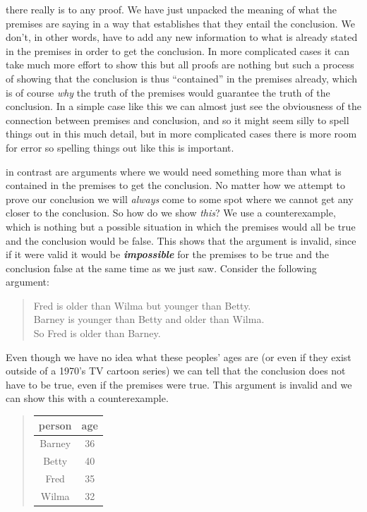 \documentclass[justified]{tufte-book}
\newenvironment{example}{\begin{quote}\normalsize}{\end{quote}}
\newenvironment{argument}{\begin{quote}\normalsize}{\end{quote}}
\begin{document}
 there really is to any proof. We have just unpacked the meaning of what the premises are saying in a way that establishes that they entail the conclusion. We don't, in other words, have to add any new information to what is already stated in the premises in order to get the conclusion. In more complicated cases it can take much more effort to show this but all proofs are nothing but such a process of showing that the conclusion is thus ``contained'' in the premises already, which is of course \emph{why} the truth of the premises would guarantee the truth of the conclusion. In a simple case like this we can almost just see the obviousness of the connection between premises and conclusion, and so it might seem silly to spell things out in this much detail, but in more complicated cases there is more room for error so spelling things out like this is important.

 in contrast are arguments where we would need something more than what is contained in the premises to get the conclusion. No matter how we attempt to prove our conclusion we will \emph{always} come to some spot where we cannot get any closer to the conclusion. So how do we show \emph{this}? We use a counterexample, which is nothing but a possible situation in which the premises would all be true and the conclusion would be false. This shows that the argument is invalid, since if it were valid it would be \textbf{\emph{impossible}} for the premises to be true and the conclusion false at the same time as we just saw. Consider the following argument:

\begin{argument}
Fred is older than Wilma but younger than Betty.\\
Barney is younger than Betty and older than Wilma.\\

So Fred is older than Barney.
\end{argument}

Even though we have no idea what these peoples' ages are (or even if they exist outside of a 1970's TV cartoon series) we can tell that the conclusion does not have to be true, even if the premises were true. This argument is invalid and we can show this with a counterexample.

\begin{example}
\begin{longtable}[]{@{}cc@{}}
\toprule
person & age\tabularnewline
\midrule
\endhead
Barney & 36\tabularnewline
Betty & 40\tabularnewline
Fred & 35\tabularnewline
Wilma & 32\tabularnewline
\bottomrule
\end{longtable}
\end{example}
\end{document}
